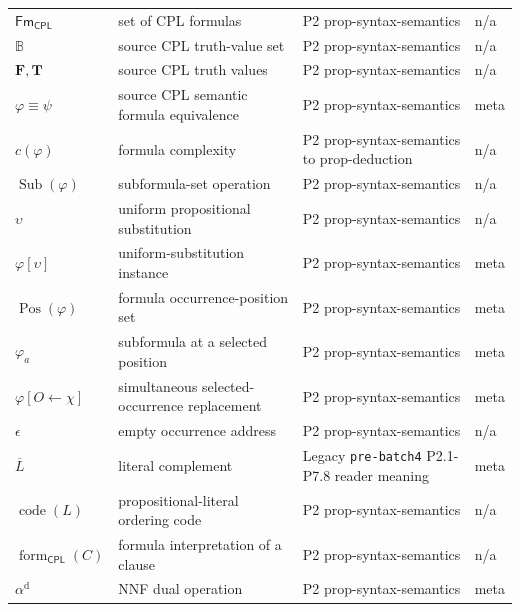 \begin{longtable}{@{}p{}p{}p{}p{}@{}}
\(\mathsf{Fm}_{\mathsf{CPL}}\) & set of CPL formulas & P2 prop-\allowbreak{}syntax-\allowbreak{}semantics & n/a \\
\(\mathbb B\) & source CPL truth-value set & P2 prop-\allowbreak{}syntax-\allowbreak{}semantics & n/a \\
\(\mathbf F,\allowbreak \mathbf T\) & source CPL truth values & P2 prop-\allowbreak{}syntax-\allowbreak{}semantics & n/a \\
\(\varphi\equiv\psi\) & source CPL semantic formula equivalence & P2 prop-\allowbreak{}syntax-\allowbreak{}semantics & meta \\
\(c(\varphi)\) & formula complexity & P2 prop-\allowbreak{}syntax-\allowbreak{}semantics to prop-\allowbreak{}deduction & n/a \\
\(\operatorname{Sub}(\varphi)\) & subformula-set operation & P2 prop-\allowbreak{}syntax-\allowbreak{}semantics & n/a \\
\(\upsilon\) & uniform propositional substitution & P2 prop-\allowbreak{}syntax-\allowbreak{}semantics & n/a \\
\(\varphi[\upsilon]\) & uniform-substitution instance & P2 prop-\allowbreak{}syntax-\allowbreak{}semantics & meta \\
\(\operatorname{Pos}(\varphi)\) & formula occurrence-position set & P2 prop-\allowbreak{}syntax-\allowbreak{}semantics & meta \\
\(\varphi_a\) & subformula at a selected position & P2 prop-\allowbreak{}syntax-\allowbreak{}semantics & meta \\
\(\varphi[O\leftarrow\chi]\) & simultaneous selected-occurrence replacement & P2 prop-\allowbreak{}syntax-\allowbreak{}semantics & meta \\
\(\epsilon\) & empty occurrence address & P2 prop-\allowbreak{}syntax-\allowbreak{}semantics & n/a \\
\(\overline L\) & literal complement & Legacy \texttt{pre-\allowbreak{}batch4} P2.\allowbreak{}1-\allowbreak{}P7.\allowbreak{}8 reader meaning & meta \\
\(\operatorname{code}(L)\) & propositional-literal ordering code & P2 prop-\allowbreak{}syntax-\allowbreak{}semantics & n/a \\
\(\operatorname{form}_{\mathsf{CPL}}(C)\) & formula interpretation of a clause & P2 prop-\allowbreak{}syntax-\allowbreak{}semantics & n/a \\
\(\alpha^{\mathrm d}\) & NNF dual operation & P2 prop-\allowbreak{}syntax-\allowbreak{}semantics & meta \\

\end{longtable}
